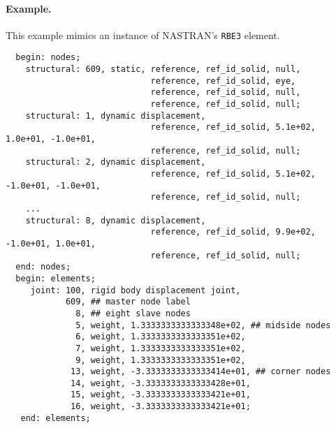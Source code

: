 \paragraph{Example.}
This example mimics an instance of NASTRAN's \texttt{RBE3} element.
\begin{Verbatim}
  begin: nodes;
    structural: 609, static, reference, ref_id_solid, null,
                             reference, ref_id_solid, eye,
                             reference, ref_id_solid, null,
                             reference, ref_id_solid, null;
    structural: 1, dynamic displacement,
                             reference, ref_id_solid, 5.1e+02,  1.0e+01, -1.0e+01,
                             reference, ref_id_solid, null;
    structural: 2, dynamic displacement,
                             reference, ref_id_solid, 5.1e+02,  -1.0e+01, -1.0e+01,
                             reference, ref_id_solid, null;
    ...
    structural: 8, dynamic displacement,
                             reference, ref_id_solid, 9.9e+02,  -1.0e+01, 1.0e+01,
                             reference, ref_id_solid, null;
  end: nodes;
  begin: elements;
     joint: 100, rigid body displacement joint,
            609, ## master node label
              8, ## eight slave nodes
              5, weight, 1.3333333333333348e+02, ## midside nodes
              6, weight, 1.3333333333333351e+02,
              7, weight, 1.3333333333333351e+02,
              9, weight, 1.3333333333333351e+02,
             13, weight, -3.3333333333333414e+01, ## corner nodes
             14, weight, -3.3333333333333428e+01,
             15, weight, -3.3333333333333421e+01,
             16, weight, -3.3333333333333421e+01;
   end: elements;
\end{Verbatim}
